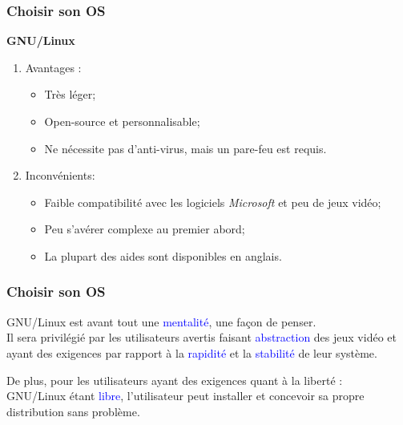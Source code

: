 \documentclass[aspectratio=169]{beamer}
\begin{document}
\begin{frame}
  \frametitle{Choisir son OS}
  \textbf{GNU/Linux}

  \hspace{0.5cm}

  \begin{enumerate}
  \item Avantages :

    \begin{itemize}
    \item Très léger;

    \item Open-source et personnalisable;

      \item Ne nécessite pas d'anti-virus, mais un pare-feu est requis.
    \end{itemize}

    \hspace{0.5cm}

  \item Inconvénients:

    \begin{itemize}
    \item Faible compatibilité avec les logiciels \textit{Microsoft} et peu de jeux vidéo;

    \item Peu s'avérer complexe au premier abord;

      \item La plupart des aides sont disponibles en anglais.
      \end{itemize}
  \end{enumerate}
\end{frame}

\begin{frame}
  \frametitle{Choisir son OS}
  GNU/Linux est avant tout une \textcolor{blue}{mentalité}, une
  façon de penser. \\
  Il sera privilégié par les utilisateurs avertis faisant
  \textcolor{blue}{abstraction} des jeux vidéo et ayant des exigences par
  rapport à la \textcolor{blue}{rapidité} et la \textcolor{blue}{stabilité} de
  leur système.

  \hspace{0.5cm}

  De plus, pour les utilisateurs ayant des exigences quant à la liberté : \\
  GNU/Linux étant \textcolor{blue}{libre}, l'utilisateur peut installer et
  concevoir sa propre distribution sans problème.

\end{frame}
\end{document}
